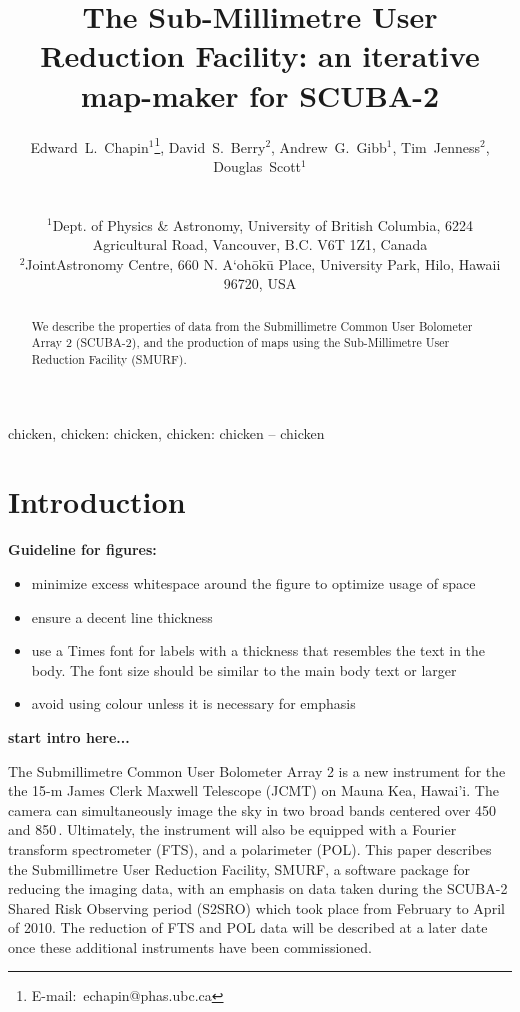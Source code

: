 \documentclass[useAMS,usenatbib,nofootinbib]{mn2e}
\title[SMURF: an iterative map-maker for SCUBA-2]{The Sub-Millimetre User
Reduction Facility: an iterative map-maker for SCUBA-2}
\author[Edward~L.~Chapin~et~al.]{
  \parbox[t]{\textwidth}{
    Edward~L.~Chapin$^{1}$\thanks{E-mail:~echapin@phas.ubc.ca},
    David~S.~Berry$^{2}$,
    Andrew~G.~Gibb$^{1}$,
    Tim~Jenness$^{2}$,
    Douglas~Scott$^{1}$
  }
  \\
  \\
  $^{1}$Dept. of Physics \& Astronomy, University of British Columbia,
  6224 Agricultural Road, Vancouver, B.C. V6T 1Z1, Canada\\
  $^{2}$JointAstronomy Centre, 660 N. A`oh\={o}k\={u} Place, University
  Park, Hilo, Hawaii 96720, USA}
\newcommand{\scuba}{SCUBA-2}
\begin{document}
\label{firstpage}

\maketitle

\begin{abstract}
  We describe the properties of data from the Submillimetre Common
  User Bolometer Array 2 (SCUBA-2), and the production of maps using
  the Sub-Millimetre User Reduction Facility (SMURF).
\end{abstract}


\begin{keywords}
chicken, chicken: chicken, chicken: chicken -- chicken
\end{keywords}

\section{Introduction}
\label{sec:intro}

\textbf{Guideline for figures:}

\begin{itemize}
\item minimize excess whitespace around the figure to optimize usage of space
\item ensure a decent line thickness
\item use a Times font for labels with a thickness that resembles the
  text in the body. The font size should be similar to the main body
  text or larger
\item avoid using colour unless it is necessary for emphasis
\end{itemize}

\textbf{start intro here...}

The Submillimetre Common User Bolometer Array 2
\citep[\scuba,][]{holland2006} is a new instrument for the the 15-m
James Clerk Maxwell Telescope (JCMT) on Mauna Kea, Hawai'i. The camera
can simultaneously image the sky in two broad bands centered over 450
and 850\,\micron. Ultimately, the instrument will also be equipped
with a Fourier transform spectrometer (FTS), and a polarimeter
(POL). This paper describes the Submillimetre User Reduction Facility,
SMURF, a software package for reducing the imaging data, with an
emphasis on data taken during the SCUBA-2 Shared Risk Observing period
(S2SRO) which took place from February to April of 2010. The reduction
of FTS and POL data will be described at a later date once these
additional instruments have been commissioned.
\end{document}
